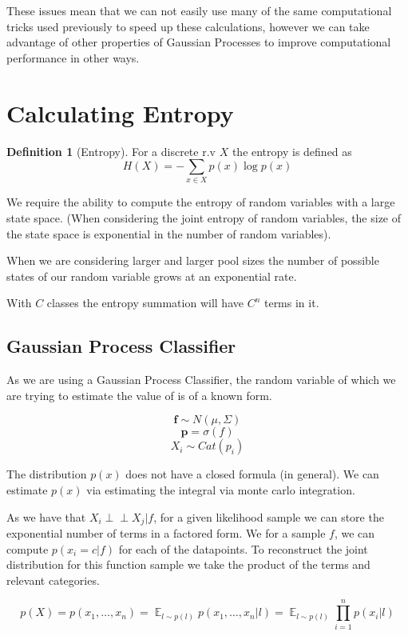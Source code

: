 \documentclass[12pt, a4paper]{report}
\theoremstyle{definition}
\theoremstyle{definition}
\newtheorem{definition}{Definition}[section]
\theoremstyle{definition}
\DeclareMathOperator{\E}{\mathbb{E}}
\begin{document}
These issues mean that we can not easily use many of the same computational tricks used previously to speed up these calculations, however we can take advantage of other properties of Gaussian Processes to improve computational performance in other ways.



\section{Calculating Entropy}
\label{sec:Entropy}

\begin{definition}[Entropy]
    For a discrete r.v $X$ the entropy is defined as $$H(X) = - \sum_{x \in X} p(x) \log p(x) $$
\end{definition}


We require the ability to compute the entropy of random variables with a large state space. (When considering the joint entropy of random variables, the size of the state space is exponential in the number of random variables).

When we are considering larger and larger pool sizes the number of possible states of our random variable grows at an exponential rate.

With $C$ classes the entropy summation will have $C^n$ terms in it. 


\subsection{Gaussian Process Classifier}
As we are using a Gaussian Process Classifier, the random variable of which we are trying to estimate the value of is of a known form.


$$ \mathbf{f} \sim N(\mu, \Sigma) $$
$$ \mathbf{p} =  \sigma \left(f \right) $$
$$ X_i \sim Cat(p_i) $$

The distribution $p(x)$ does not have a closed formula (in general). We can estimate $p(x)$ via estimating the integral via monte carlo integration.



As we have that $ X_i \perp\!\!\!\perp X_j | f$, for a given likelihood sample we can store the exponential number of terms in a factored form. We for a sample $f$, we can compute $p(x_i = c | f)$ for each of the datapoints. To reconstruct the joint distribution for this function sample we take the product of the terms and relevant categories.


$$ p(X) = p(x_1, \ldots, x_n) = \E_{l \sim p(l)}  p(x_1, \ldots, x_n | l) = \E_{l \sim p(l)} \prod_{i=1}^n  p(x_i| l)$$
\end{document}
